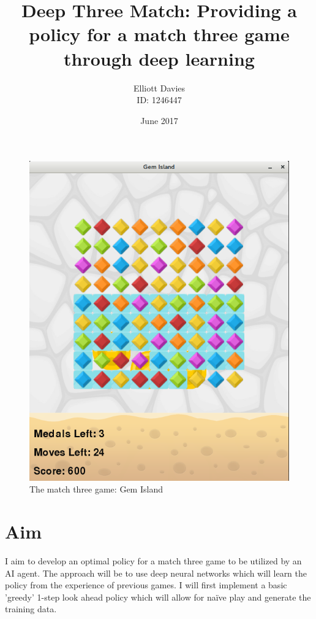 \documentclass{bhamthesis}
\title{Deep Three Match: Providing a policy for a match three game through deep learning}
\author{Elliott Davies \\ ID: 1246447}
\date{June 2017}  %
\makeatletter
\theoremstyle{definition}
\newcommand{\makecrestcover}{
\begin{titlepage}
\centering\singlespacing
\vspace*{1cm}
{\huge\bfseries University of Birmingham\par}
\vspace*{2cm}
\texttt{[image: media/img/crest]}\par
\vspace*{\stretch{1}}
{\Huge\bfseries
\@author\par
\vspace{1cm}
\@title\par}
\vspace*{\stretch{1}}
{\Large\@date\par}
\end{titlepage}
}
\makeatother
\begin{document}
\frontmatter

\maketitle



\mainmatter

\begin{figure}
\begin{center}
\includegraphics[scale=.3]{media/img/gem_island.png} 
\caption{The match three game: Gem Island}
\label{f.gemisland}
\end{center}
\end{figure}

\section*{Aim}
I aim to develop an optimal policy for a match three game to be utilized by an AI agent. The approach will be to use deep neural networks which will learn the policy from the experience of previous games. I will first implement a basic 'greedy' 1-step look ahead policy which will allow for na\"{i}ve play and generate the training data.
\end{document}
